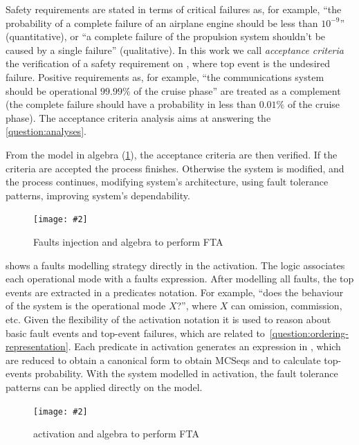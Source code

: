 \documentclass[12pt,openright,twoside,a4paper,oldfontcommands,english,brazil,final]{abntex2}
\theoremstyle{theo}
\newcommand{\includegraphicsaspectratio}[2][1]{%
  \texttt{[image: \#2]}%
}
\begin{document}
Safety requirements are stated in terms of critical failures as, for example, ``the probability of a complete failure of an airplane engine should be less than $10^{-9}$'' (quantitative), or ``a complete failure of the propulsion system shouldn't be caused by a single failure'' (qualitative).
In this work we call \emph{acceptance criteria} the verification of a safety requirement on , where  top event is the undesired failure.
Positive requirements as, for example, ``the communications system should be operational $99.99\%$ of the cruise phase'' are treated as a complement (the complete failure should have a probability in less than $0.01\%$ of the cruise phase).
The acceptance criteria analysis aims at answering the \ref{question:analyses}.

From the model in \ac{algebra} (\cref{fig:strategy-overview-csp}), the acceptance criteria are then verified.
If the criteria are accepted the process finishes.
Otherwise the system is modified, and the process continues, modifying system's architecture, using fault tolerance patterns, improving system's dependability.
%
\begin{figure}[htb]
  \centering
  \includegraphicsaspectratio[0.8]{StrategyOverview-csp-path}
  \caption{Faults injection and \ac{algebra} to perform \ac{FTA}}
  \label{fig:strategy-overview-csp}
\end{figure}

 shows a faults modelling strategy directly in the \ac{activation}.
The logic associates each operational mode with a faults expression.
After modelling all faults, the top events are extracted in a predicates notation. 
For example, ``does the behaviour of the system is the operational mode $X$?'', where $X$ can omission, commission, etc.
Given the flexibility of the \ac{activation} notation it is used to reason about basic fault events and top-event failures, which are related to~\ref{question:ordering-representation}.
Each predicate in \ac{activation} generates an expression in , which are reduced to obtain a canonical form to obtain \acp{MCSeq} and to calculate top-events probability.
With the system modelled in \ac{activation}, the fault tolerance patterns can be applied directly on the model.
%
\begin{figure}[htb]
  \centering
  \includegraphicsaspectratio[0.8]{StrategyOverview-activation-path}
  \caption{\Ac{activation} and \ac{algebra} to perform \ac{FTA}}
  \label{fig:strategy-overview-activation}
\end{figure}
\end{document}
